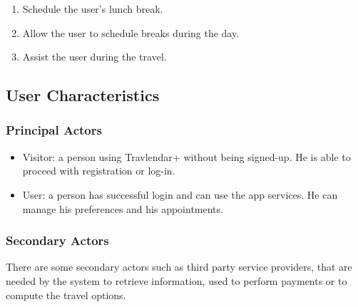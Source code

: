 \begin{enumerate}
  	\item Schedule the user’s lunch break.
	
  	\item Allow the user to schedule breaks during the day.

	
  	\item Assist the user during the travel.
	
\end{enumerate}

\subsection{User Characteristics}

\subsubsection{Principal Actors}

\renewcommand{\labelitemi}{$-$}
\begin{itemize}
\item
Visitor: a person using Travlendar+ without being signed-up. He is able to proceed with registration or log-in.
\item
User: a person has successful login and can use the app services. He can manage his preferences and his appointments.
\end{itemize}

\subsubsection{Secondary Actors}
There are some secondary actors such as third party service providers, that are needed by the system to retrieve information, used to perform payments or to compute the travel options. 
